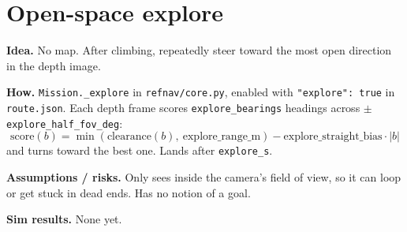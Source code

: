 \section{Open-space explore}
\textbf{Idea.} No map. After climbing, repeatedly steer toward the most open direction in the depth image.

\textbf{How.} \texttt{Mission.\_explore} in \texttt{refnav/core.py}, enabled with
\texttt{"explore": true} in \texttt{route.json}. Each depth frame scores
\texttt{explore\_bearings} headings across $\pm$\texttt{explore\_half\_fov\_deg}:
\[
  \text{score}(b) = \min(\text{clearance}(b),\ \text{explore\_range\_m}) - \text{explore\_straight\_bias}\cdot|b|
\]
and turns toward the best one. Lands after \texttt{explore\_s}.

\textbf{Assumptions / risks.} Only sees inside the camera's field of view, so it can loop or
get stuck in dead ends. Has no notion of a goal.

\textbf{Sim results.} None yet.
